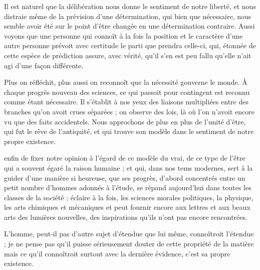 \documentclass[11pt,a4paper]{article}
\begin{document}
Il est naturel que la délibération nous donne le sentiment de notre
liberté, et nous distraie même de la prévision d'une détermination, qui
bien que nécessaire, nous semble avoir été sur le point d'être changée en
une détermination contraire.  Aussi voyons que une personne
qui connoît à la fois la position et le caractère d'une autre personne
prévoit avec certitude le parti que  prendra  celle-ci, qui, étonnée de cette espèce de prédiction
assure, avec vérité, qu'il s'en est peu fallu qu'elle n'ait agi d'une
façon différente.

Plus on réfléchit, plus aussi on reconnoît que la nécessité gouverne le
monde. À chaque progrès nouveau des sciences, ce qui passoit pour
contingent est reconnu comme étant nécessaire. Il s'établit à nos yeux
des liaisons multipliées entre des branches qu'on avoit crues séparées ;
on observe des lois, là où l'on n'avoit encore vu que des faits
accidentels. Nous approchons de plus en plus de l'unité d'être, qui fut
le rêve de l'antiquité, et qui trouve son modèle dans le sentiment de
notre propre existence.

 enfin de fixer notre opinion à l'égard de ce modèle
du vrai, de ce type de l'être qui a souvent égaré la raison humaine ; et
qui, dans nos tems modernes, sert à la guider d'une manière si heureuse,
que ses progrès,  d'abord concentrés entre un petit nombre
d'hommes adonnés à l'étude, se répand aujourd'hui dans toutes les classes
de la société ;  éclaire à la fois, les sciences morales
politiques, la physique, les arts chimiques et mécaniques et peut fournir
encore aux lettres et aux beaux arts des lumières nouvelles, des
inspirations qu'ils n'ont pas encore rencontrées.

L'homme,  peut-il pas d'autre sujet d'étendue que
lui même, connoîtroit l'étendue ; je ne pense pas qu'il puisse
sérieusement douter de cette propriété de la matière mais ce qu'il
connoîtroit surtout avec la dernière évidence, c'est sa propre
existence.
\end{document}
